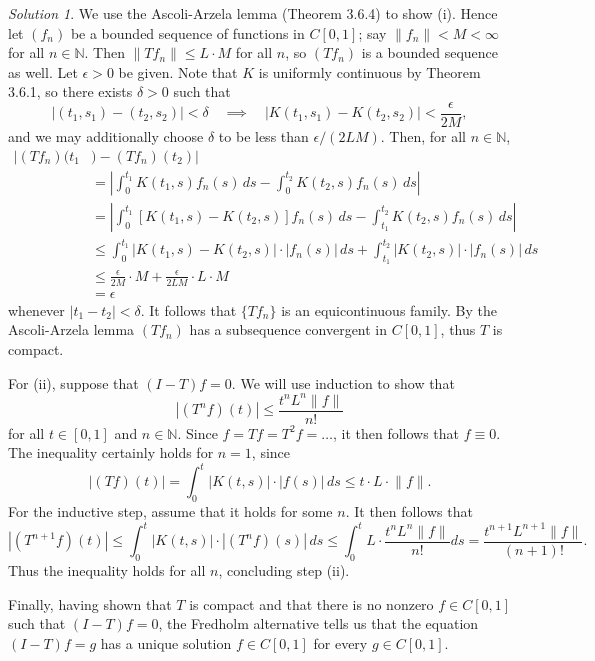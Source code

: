 \documentclass{report}
\newcommand{\bb}[1]{\mathbb{#1}}
\newcommand{\norm}[1]{{\lVert #1 \rVert}}
\newcommand{\sabs}[1]{\left\lvert #1 \right\rvert}
\theoremstyle{remark}
\newtheorem*{solution}{Solution}
\begin{document}
\begin{solution}
  We use the Ascoli-Arzela lemma (Theorem 3.6.4) to show (i). Hence let $(f_n)$ be a bounded sequence of functions in $C[0,1]$; say $\norm{f_n} < M < \infty$ for all $n \in \bb N$. Then $\norm{Tf_n} \le L \cdot M$ for all $n$, so $(Tf_n)$ is a bounded sequence as well. Let $\epsilon > 0$ be given. Note that $K$ is uniformly continuous by Theorem 3.6.1, so there exists $\delta > 0$ such that
  \begin{equation*}
    |(t_1, s_1) - (t_2, s_2)| < \delta \quad \implies \quad |K(t_1, s_1) - K(t_2, s_2)| < \frac{\epsilon}{2M},
  \end{equation*}
  and we may additionally choose $\delta$ to be less than $\epsilon/(2 L M)$. Then, for all $n \in \bb N$,
  \begin{equation*}
    \begin{split}
      |(Tf_n)(t_1&) - (Tf_n)(t_2)| \\
      &= \sabs{\int_0^{t_1} K(t_1,s) f_n(s) \, ds - \int_0^{t_2} K(t_2,s) f_n(s) \, ds} \\
      &= \sabs{\int_0^{t_1} [K(t_1,s) - K(t_2,s)] f_n(s) \, ds - \int_{t_1}^{t_2} K(t_2, s) f_n(s) \, ds} \\
      &\le \int_0^{t_1} |K(t_1,s) - K(t_2,s)| \cdot |f_n(s)| \, ds + \int_{t_1}^{t_2} |K(t_2, s)| \cdot |f_n(s)| \, ds \\
      &\le \frac{\epsilon}{2M} \cdot M + \frac{\epsilon}{2LM} \cdot L \cdot M \\
      &= \epsilon
    \end{split}
  \end{equation*}
  whenever $|t_1 - t_2| < \delta$. It follows that $\{Tf_n\}$ is an equicontinuous family. By the Ascoli-Arzela lemma $(Tf_n)$ has a subsequence convergent in $C[0,1]$, thus $T$ is compact.

  For (ii), suppose that $(I-T)f = 0$. We will use induction to show that
  \begin{equation*}
    |(T^n f)(t)| \le \frac{t^n L^n \norm f}{n!}
  \end{equation*}
  for all $t \in [0,1]$ and $n \in \bb N$. Since $f = Tf = T^2f = \dots$, it then follows that $f \equiv 0$. The inequality certainly holds for $n = 1$, since
  \begin{equation*}
    |(T f)(t)| = \int_0^t |K(t,s)| \cdot |f(s)| \, ds \le t \cdot L \cdot \norm f.
  \end{equation*}
  For the inductive step, assume that it holds for some $n$. It then follows that
  \begin{equation*}
    |(T^{n+1} f)(t)| \le \int_0^t |K(t,s)| \cdot |(T^n f)(s)| \, ds \le \int_0^t L \cdot \frac{t^n L^n \norm f}{n!} ds = \frac{t^{n+1} L^{n+1} \norm f}{(n+1)!}.
  \end{equation*}
  Thus the inequality holds for all $n$, concluding step (ii).

  Finally, having shown that $T$ is compact and that there is no nonzero $f \in C[0,1]$ such that $(I -T)f = 0$, the Fredholm alternative tells us that the equation $(I-T)f = g$ has a unique solution $f \in C[0,1]$ for every $g \in C[0,1]$.
\end{solution}
\end{document}

